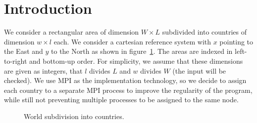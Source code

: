 \section{Introduction}
\label{sec:intro}

We consider a rectangular area of dimension $W \times L$ subdivided into countries of dimension $w \times l$ each. We consider a cartesian reference system with $x$ pointing to the East and $y$ to the North as shown in figure~\ref{fig:area_subdivision}. The areas are indexed in left-to-right and bottom-up order.
For simplicity, we assume that these dimensions are given as integers, that $l$ divides $L$ and $w$ divides $W$ (the input will be checked).
We use MPI as the implementation technology, so we decide to assign each country to a separate MPI process to improve the regularity of the program, while still not preventing multiple processes to be assigned to the same node.
\begin{figure}[h]
    \centering
    \begin{subfigure}[c]{0.7\textwidth}
    \end{subfigure}
    \begin{subfigure}[c]{0.29\textwidth}
    \end{subfigure}
    \caption{World subdivision into countries.}
    \label{fig:area_subdivision}
\end{figure}


